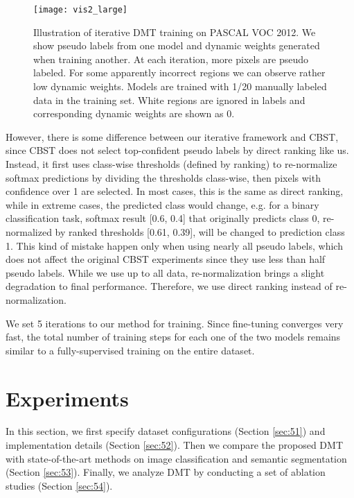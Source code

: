 \documentclass[preprint,review,10pt]{elsarticle}
\begin{document}
\begin{figure}[t]
\centering
\texttt{[image: vis2\_large]}
\caption{Illustration of iterative DMT training on PASCAL VOC 2012. We show pseudo labels from one model and dynamic weights generated when training another. At each iteration, more pixels are pseudo labeled. For some apparently incorrect regions we can observe rather low dynamic weights. Models are trained with 1/20 manually labeled data in the training set. White regions are ignored in labels and corresponding dynamic weights are shown as 0. }
\label{fig12}
\end{figure}

However, there is some difference between our iterative framework and CBST, since CBST does not select top-confident pseudo labels by direct ranking like us. Instead, it first uses class-wise thresholds (defined by ranking) to re-normalize softmax predictions by dividing the thresholds class-wise, then pixels with confidence over 1 are selected. In most cases, this is the same as direct ranking, while in extreme cases, the predicted class would change, e.g. for a binary classification task, softmax result [0.6, 0.4] that originally predicts class 0, re-normalized by ranked thresholds [0.61, 0.39], will be changed to prediction class 1. This kind of mistake happen only when using nearly all pseudo labels, which does not affect the original CBST experiments since they use less than half pseudo labels. While we use up to all data, re-normalization brings a slight degradation to final performance. Therefore, we use direct ranking instead of re-normalization.

We set 5 iterations to our method for training. Since fine-tuning converges very fast, the total number of training steps for each one of the two models remains similar to a fully-supervised training on the entire dataset.





\section{Experiments}
\label{sec:5}

In this section, we first specify dataset configurations (Section \ref{sec:51}) and implementation details (Section \ref{sec:52}). Then we compare the proposed DMT with state-of-the-art methods on image classification and semantic segmentation (Section \ref{sec:53}). Finally, we analyze DMT by conducting a set of ablation studies (Section \ref{sec:54}).
\end{document}
